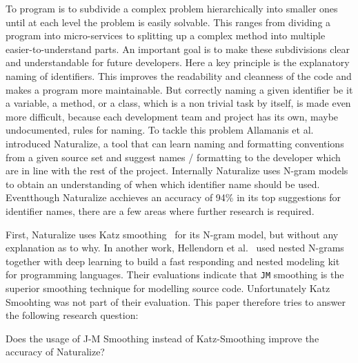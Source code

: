 To program is to subdivide a complex problem hierarchically into smaller ones until at each level the problem is easily solvable. This ranges from dividing a program into micro-services to splitting up a complex method into multiple easier-to-understand parts.
An important goal is to make these subdivisions clear and understandable for future developers. Here a key principle is the explanatory naming of identifiers. This improves the readability and cleanness of the code and makes a program more maintainable. But correctly naming a given identifier be it a variable, a method, or a class, which is a non trivial task by itself, is made even more difficult, because each development team and project has its own, maybe undocumented, rules for naming. To tackle this problem Allamanis et al.~\cite{naturalize} introduced Naturalize, a tool that can learn naming and formatting conventions from a given source set and suggest names / formatting to the developer which are in line with the rest of the project. Internally Naturalize uses N-gram models to obtain an understanding of when which identifier name should be used. Eventthough Naturalize acchieves an accuracy of 94\% in its top suggestions for identifier names, there are a few areas where further research is required.

First, Naturalize uses Katz smoothing~\cite{naturalize} for its N-gram model, but without any explanation as to why. In another work, Hellendorn et al.~\cite{nestedngram} used nested N-grams together with deep learning to build a fast responding and nested modeling kit for programming languages. Their evaluations indicate that \texttt{JM} smoothing is the superior smoothing technique for modelling source code. Unfortunately Katz Smoohting was not part of their evaluation. This paper therefore tries to answer the following research question:

\begin{resquest} \label{hyp:jmsmoothing}
Does the usage of J-M Smoothing instead of Katz-Smoothing improve the accuracy of Naturalize?
\end{resquest}

